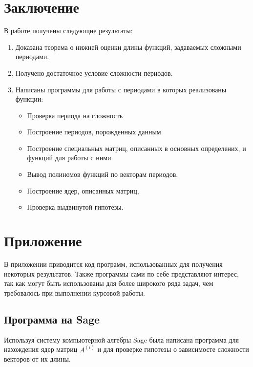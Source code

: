 \documentclass[bibliography=totoc, a4paper, 14pt]{extarticle}
\let\stdsection\section
\renewcommand\section{\newpage\stdsection}
\begin{document}
\section{Заключение}
В работе получены следующие результаты:
\begin{enumerate}
\item Доказана теорема о нижней оценки длины функций, задаваемых сложными периодами.

\item Получено достаточное условие сложности периодов.

\item Написаны программы для работы с периодами в которых реализованы функции:
\begin{itemize}
\item Проверка периода на сложность
\item Построение периодов, порожденных данным
\item Построение специальных матриц, описанных в основных определених,
и функций для работы с ними.
\item Вывод полиномов функций по векторам периодов,
\item Построение ядер, описанных матриц,
\item Проверка выдвинутой гипотезы.
\end{itemize}
\end{enumerate}


\section{Приложение}

В приложении приводится код программ, использованных для получения некоторых результатов. Также программы
сами по себе представляют интерес, так как могут быть использованы для более широкого ряда задач,
чем требовалось при выполнении курсовой работы.

\subsection{Программа на Sage} \label{sub:sage}
Используя систему компьютерной алгебры {S}age\cite{sage} была написана программа для нахождения
ядер матриц $A^{(i)}$ и для проверке гипотезы о зависимосте сложности векторов от их длины.
\end{document}

